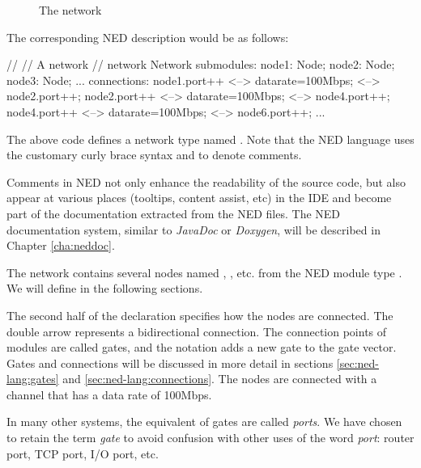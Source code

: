 \begin{figure}[htbp]
  \begin{center}
    \caption{The network}
    \label{fig:ned-routing-topology}
  \end{center}
\end{figure}

The corresponding NED description would be as follows:

\begin{ned}
//
// A network
//
network Network
{
    submodules:
        node1: Node;
        node2: Node;
        node3: Node;
        ...
    connections:
        node1.port++ <--> {datarate=100Mbps;} <--> node2.port++;
        node2.port++ <--> {datarate=100Mbps;} <--> node4.port++;
        node4.port++ <--> {datarate=100Mbps;} <--> node6.port++;
        ...
}
\end{ned}

The above code defines a network type named . Note that the NED
language uses the customary curly brace syntax and \ttt{//} to denote comments.

\begin{note}
    Comments in NED not only enhance the readability of the source code, but
    also appear at various places (tooltips, content assist, etc) in the {\opp}
    IDE and become part of the documentation extracted from the NED files. The
    NED documentation system, similar to \textit{JavaDoc} or \textit{Doxygen},
    will be described in Chapter \ref{cha:neddoc}.
\end{note}

The network contains several nodes named , , etc. from the
NED module type . We will define  in the following sections.

The second half of the declaration specifies how the nodes are connected. The
double arrow represents a bidirectional connection. The connection points of
modules are called gates, and the notation  adds a new gate to the
 gate vector. Gates and connections will be discussed in more detail
in sections \ref{sec:ned-lang:gates} and \ref{sec:ned-lang:connections}. The
nodes are connected with a channel that has a data rate of 100Mbps.

\begin{note}
    In many other systems, the equivalent of {\opp} gates are called
    \textit{ports}. We have chosen to retain the term \textit{gate} to avoid
    confusion with other uses of the word \textit{port}: router port, TCP port,
    I/O port, etc.
\end{note}

